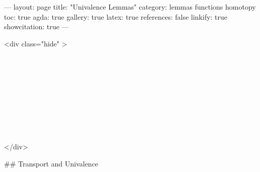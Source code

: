 ---
layout: page
title: "Univalence Lemmas"
category: lemmas functions homotopy
toc: true
agda: true
gallery: true
latex: true
references: false
linkify: true
showcitation: true
---

<div class="hide" >
\begin{code}%
\>[0]\AgdaSymbol{\{-\#}\AgdaSpace{}%
\AgdaSpace{}%
\AgdaSpace{}%
\AgdaSymbol{\#-\}}\<%
\\
\>[0]\AgdaSpace{}%
\AgdaSpace{}%
\<%
\\
\>[0]\AgdaSpace{}%
\AgdaSpace{}%
\<%
\\
%
\\[\AgdaEmptyExtraSkip]%
\>[0]\AgdaSpace{}%
\AgdaSpace{}%
\<%
\\
\>[0]\AgdaSpace{}%
\AgdaSpace{}%
\<%
\\
\>[0]\AgdaSpace{}%
\AgdaSpace{}%
\<%
\\
%
\\[\AgdaEmptyExtraSkip]%
\>[0]\AgdaSpace{}%
\AgdaSpace{}%
\<%
\end{code}
</div>

## Transport and Univalence

\begin{code}%
\>[0]\AgdaSpace{}%
\AgdaSpace{}%
\<%
\end{code}

